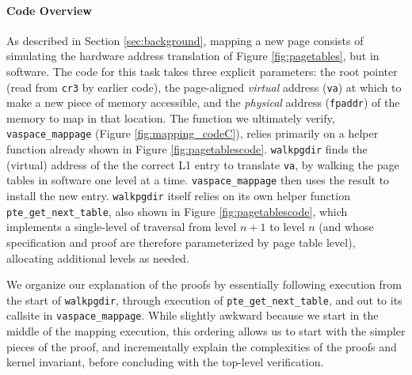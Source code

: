\paragraph{Code Overview}
As described in Section \ref{sec:background}, mapping a new page consists of 
simulating the hardware address translation of Figure \ref{fig:pagetables}, but in software.
The code for this task takes three explicit parameters:
the root pointer (read from \lstinline|cr3| by earlier code),
the page-aligned \emph{virtual} address (\lstinline|va|) at which to make a new piece of memory accessible,
and the \emph{physical} address (\lstinline|fpaddr|) of the memory to map in that location.
The function we ultimately verify, \lstinline|vaspace_mappage| (Figure \ref{fig:mapping_codeC}),
relies primarily on a helper function already shown in Figure \ref{fig:pagetablescode}.
\lstinline|walkpgdir| finds the (virtual) address of the the correct L1 entry to translate \lstinline|va|,
by walking the page tables in software one level at a time.
\lstinline|vaspace_mappage| then uses the result to install the new entry.
\lstinline|walkpgdir| itself relies on its own helper function \lstinline|pte_get_next_table|, also shown in Figure \ref{fig:pagetablescode},
which implements a single-level of traversal from level $n+1$ to level $n$ (and whose specification and proof are therefore
parameterized by page table level), allocating additional levels as needed.

We organize our explanation of the proofs by essentially following execution from the start of \lstinline|walkpgdir|, through
execution of \lstinline|pte_get_next_table|, and out to its callsite in \lstinline|vaspace_mappage|.
While slightly awkward because we start in the middle of the mapping execution,
this ordering allows us to start with the simpler pieces of the proof, and incrementally explain the complexities
of the proofs and kernel invariant, before concluding with the top-level verification.



